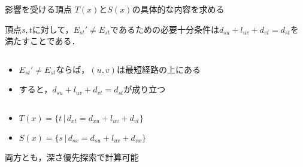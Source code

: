 \documentclass[dvipdfmx,fleqn]{beamer}
\begin{document}
\begin{frame}{影響を受ける頂点}
  $T(x)$と$S(x)$の具体的な内容を求める
  \begin{lemma}
    頂点$s,t$に対して，$E_{st}'\neq E_{st}$であるための必要十分条件は$d_{su}+l_{uv}+d_{vt}=d_{st}$を満たすことである．
  \end{lemma}
  \begin{columns}[T]
    \begin{column}{0.60\textwidth}
      \begin{itemize}
      \item $E_{st}'\neq E_{st}$ならば，$(u,v)$は最短経路の上にある
      \item すると，$d_{su}+l_{uv}+d_{vt}=d_{st}$が成り立つ
      \end{itemize}
    \end{column}
    \begin{column}{0.38\textwidth}
      \centering
      \def\svgwidth{.9\columnwidth}
      
    \end{column}
  \end{columns}
  \begin{itemize}
  \item $T(x)=\{t\,|\,d_{xt}=d_{xu}+l_{uv}+d_{vt}\}$
  \item $S(x)=\{s\,|\,d_{sx}=d_{su}+l_{uv}+d_{vx}\}$
  \end{itemize}
  両方とも，\alert{深さ優先探索}で計算可能
\end{frame}
\end{document}
